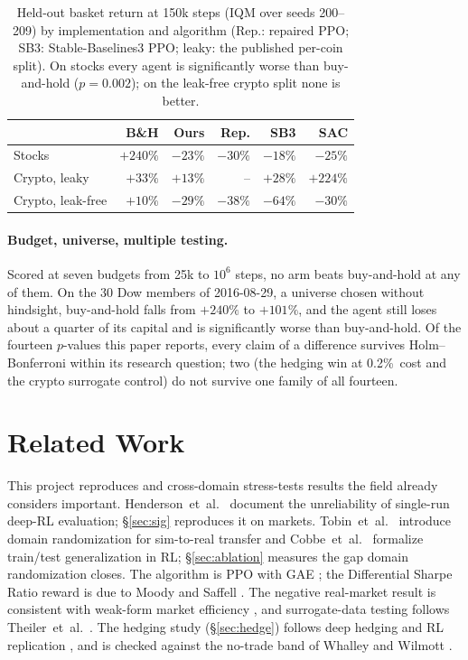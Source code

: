 \documentclass[10pt,twocolumn]{article}
\newcommand{\pc}{\%}  %
\begin{document}
\begin{table}[t]\centering\footnotesize
\caption{Held-out basket return at 150k steps (IQM over seeds 200--209) by
implementation and algorithm (Rep.: repaired PPO; SB3: Stable-Baselines3 PPO;
leaky: the published per-coin split). On stocks every agent is significantly worse than
buy-and-hold ($p=0.002$); on the leak-free crypto split none is better.}
\label{tab:robust}
\begin{tabular}{@{}lrrrrr@{}}
\toprule
 & B\&H & Ours & Rep. & SB3 & SAC\\
\midrule
Stocks & $+240\pc$ & $-23\pc$ & $-30\pc$ & $-18\pc$ & $-25\pc$\\
Crypto, leaky & $+33\pc$ & $+13\pc$ & -- & $+28\pc$ & $+224\pc$\\
Crypto, leak-free & $+10\pc$ & $-29\pc$ & $-38\pc$ & $-64\pc$ & $-30\pc$\\
\bottomrule
\end{tabular}
\end{table}

\paragraph{Budget, universe, multiple testing.} Scored at seven budgets from 25k to
$10^6$ steps, no arm beats buy-and-hold at any of them. On the 30 Dow members of
2016-08-29, a universe chosen without hindsight, buy-and-hold falls from $+240\pc$
to $+101\pc$, and the agent still loses about a quarter of its capital and is
significantly worse than buy-and-hold. Of the fourteen $p$-values this paper
reports, every claim of a difference survives Holm--Bonferroni within its research
question; two (the hedging win at 0.2\pc\ cost and the crypto surrogate control)
do not survive one family of all fourteen.

\section{Related Work}
This project reproduces and cross-domain stress-tests results the field already
considers important. Henderson~et~al.\ \cite{henderson2018} document the unreliability of
single-run deep-RL evaluation; \S\ref{sec:sig} reproduces it on markets.
Tobin~et~al.\ \cite{tobin2017} introduce domain randomization for sim-to-real transfer and
Cobbe~et~al.\ \cite{cobbe2019} formalize train/test generalization in RL; \S\ref{sec:ablation}
measures the gap domain randomization closes. The algorithm is PPO \cite{ppo} with
GAE \cite{gae}; the Differential Sharpe Ratio reward is due to
Moody and Saffell \cite{moody2001}. The negative real-market result is consistent with weak-form
market efficiency \cite{fama1970}, and surrogate-data testing follows
Theiler~et~al.\ \cite{theiler1992}. The hedging study (\S\ref{sec:hedge}) follows deep
hedging \cite{buehler2019} and RL replication \cite{kolm2019}, and is checked against
the no-trade band of Whalley and Wilmott \cite{whalley1997}.
\end{document}
